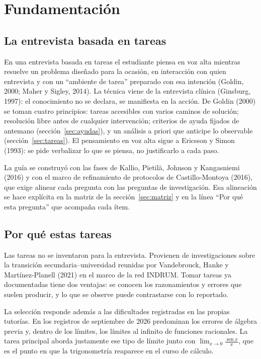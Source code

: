 \documentclass[11pt,letterpaper]{article}
\DeclareMathOperator{\seno}{sen}
\newcommand{\limsen}{\displaystyle\lim_{x\to 0}\frac{\seno x}{x}}
\newcounter{preg}
\begin{document}
\section{Fundamentación}

\subsection{La entrevista basada en tareas}
En una entrevista basada en tareas el estudiante piensa en voz alta mientras resuelve un problema diseñado para la ocasión, en interacción con quien entrevista y con un ``ambiente de tarea'' preparado con esa intención (Goldin, 2000; Maher y Sigley, 2014). La técnica viene de la entrevista clínica (Ginsburg, 1997): el conocimiento no se declara, se manifiesta en la acción. De Goldin (2000) se toman cuatro principios: tareas accesibles con varios caminos de solución; resolución libre antes de cualquier intervención; criterios de ayuda fijados de antemano (sección~\ref{sec:ayudas}), y un análisis a priori que anticipe lo observable (sección~\ref{sec:tareas}). El pensamiento en voz alta sigue a Ericsson y Simon (1993): se pide verbalizar lo que se piensa, no justificarlo a cada paso.

La guía se construyó con las fases de Kallio, Pietilä, Johnson y Kangasniemi (2016) y con el marco de refinamiento de protocolos de Castillo-Montoya (2016), que exige alinear cada pregunta con las preguntas de investigación. Esa alineación se hace explícita en la matriz de la sección~\ref{sec:matriz} y en la línea ``Por qué esta pregunta'' que acompaña cada ítem.

\subsection{Por qué estas tareas}
Las tareas no se inventaron para la entrevista. Provienen de investigaciones sobre la transición secundaria--universidad reunidas por Vandebrouck, Hanke y Martínez-Planell (2021) en el marco de la red INDRUM. Tomar tareas ya documentadas tiene dos ventajas: se conocen los razonamientos y errores que suelen producir, y lo que se observe puede contrastarse con lo reportado.

La selección responde además a las dificultades registradas en las propias tutorías. En los registros de septiembre de 2026 predominan los errores de álgebra previa y, dentro de los límites, los límites al infinito de funciones racionales. La tarea principal aborda justamente ese tipo de límite junto con $\limsen$, que es el punto en que la trigonometría reaparece en el curso de cálculo.
\end{document}

